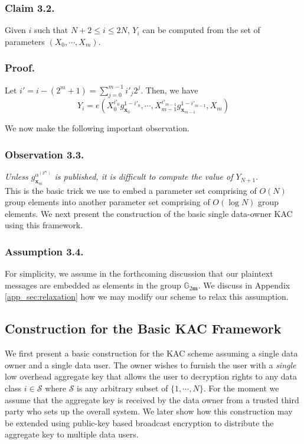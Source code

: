 \subsubsection{Claim 3.2.} Given $i$ such that $N+2\leq i \leq 2N$, $Y_i$ can be computed from the set of parameters $(X_0,\cdots,X_m)$.
\subsubsection{Proof.} Let $i'=i-(2^m+1)=\sum_{j=0}^{m-1}i'_j2^j$. Then, we have  
\begin{equation}
 Y_i=e(X^{i'_0}_0g^{1-i'_0}_{\mathbf{x}_0},\cdots,X^{i'_{m-1}}_{m-1}g^{1-i'_{m-1}}_{\mathbf{x}_{m-1}},X_m)\nonumber
\end{equation}

\noindent We now make the following important observation.
\subsubsection{Observation 3.3.} \emph{Unless $g^{\alpha^{(2^m)}}_{\mathbf{x}_m}$ is published, it is difficult to compute the value of $Y_{N+1}$}.\\

\noindent This is the basic trick we use to embed a parameter set comprising of $O(N)$ group elements into another parameter set comprising of $O(\log N)$ group elements. We next present the construction of the basic single data-owner KAC using this framework.

\subsubsection{Assumption 3.4.} For simplicity, we assume in the forthcoming discussion that our plaintext messages are embedded as elements in the group $\mathbb{G}_{2\mathbf{m}}$. We discuss in Appendix \ref{app_sec:relaxation} how we may modify our scheme to relax this assumption.

\subsection{Construction for the Basic KAC Framework}
\label{subsec:construction}

We first present a basic construction for the KAC scheme assuming a single data owner and a single data user. The owner wishes to furnish the user with a \emph{single} low overhead aggregate key that allows the user to decryption rights to any data class $i\in\mathcal{S}$ where $\mathcal{S}$ is any arbitrary subset of $\{1,\cdots,N\}$. For the moment we assume that the aggregate key is received by the data owner from a trusted third party who sets up the overall system. We later show how this construction may be extended using public-key based broadcast encryption to distribute the aggregate key to multiple data users.   

